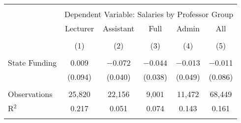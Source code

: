 
\begin{tabular}{@{\extracolsep{5pt}}lccccc} 
\\[-1.8ex]\hline 
\hline \\[-1.8ex] 
 & \multicolumn{5}{c}{Dependent Variable: Salaries by Professor Group} \\ 
\cline{2-6} 
 & Lecturer & Assistant & Full & Admin & All \\ 
\\[-1.8ex] & (1) & (2) & (3) & (4) & (5)\\ 
\hline \\[-1.8ex] 
 State Funding & 0.009 & $-$0.072 & $-$0.044 & $-$0.013 & $-$0.011 \\ 
  & (0.094) & (0.040) & (0.038) & (0.049) & (0.086) \\ 
 \hline \\[-1.8ex] 
Observations & 25,820 & 22,156 & 9,001 & 11,472 & 68,449 \\ 
R$^{2}$ & 0.217 & 0.051 & 0.074 & 0.143 & 0.161 \\ 
\hline 
\hline \\[-1.8ex] 
\end{tabular} 
